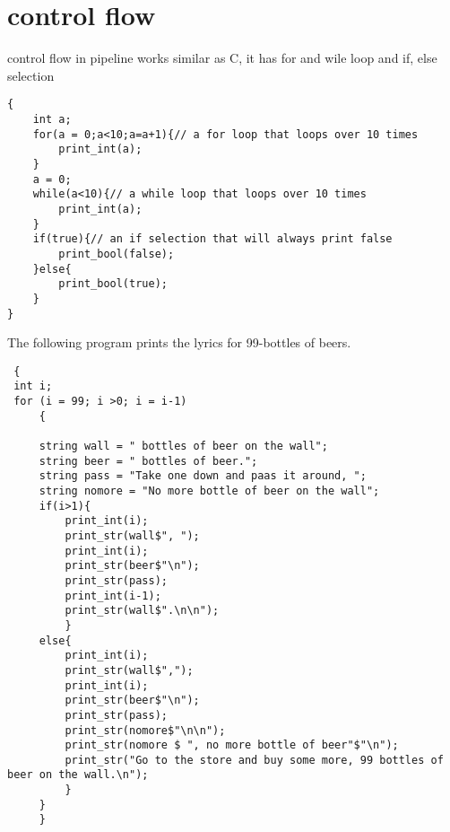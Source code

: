 \documentclass[./Report_main.tex]{subfiles}
\begin{document}
\section{control flow}
control flow in pipeline works similar as C, it has for and wile loop and if, else selection\\
\begin{lstlisting}
{
    int a; 
    for(a = 0;a<10;a=a+1){// a for loop that loops over 10 times
        print_int(a);
    }
    a = 0;
    while(a<10){// a while loop that loops over 10 times
        print_int(a);
    }
    if(true){// an if selection that will always print false
        print_bool(false);
    }else{
        print_bool(true);
    }
}
\end{lstlisting}
The following program prints the lyrics for 99-bottles of beers.\\
\begin{lstlisting}
 {
 int i;
 for (i = 99; i >0; i = i-1)
     {
 
     string wall = " bottles of beer on the wall";
     string beer = " bottles of beer.";
     string pass = "Take one down and paas it around, ";
     string nomore = "No more bottle of beer on the wall";
     if(i>1){
         print_int(i);
         print_str(wall$", ");
         print_int(i);
         print_str(beer$"\n");
         print_str(pass);
         print_int(i-1);
         print_str(wall$".\n\n");
         }
     else{
         print_int(i);
         print_str(wall$",");
         print_int(i);
         print_str(beer$"\n");
         print_str(pass);
         print_str(nomore$"\n\n");
         print_str(nomore $ ", no more bottle of beer"$"\n");
         print_str("Go to the store and buy some more, 99 bottles of beer on the wall.\n");
         }
     }
     }
\end{lstlisting}
\end{document}
